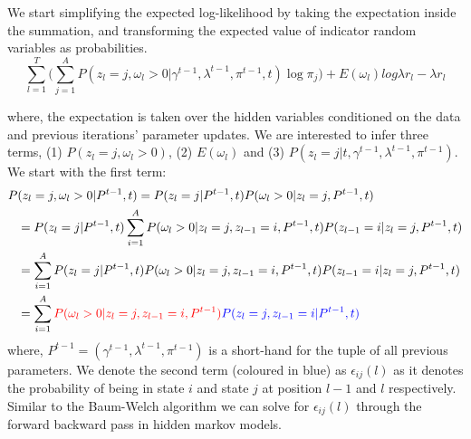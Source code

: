 We start simplifying the expected log-likelihood by taking the expectation inside the summation, and transforming the expected value of indicator random variables as probabilities. 
\begin{equation}
     \sum\limits_{l=1}^{T} \Big( \sum\limits_{j=1}^{A} P(z_l = j, \omega_l > 0 \vert \gamma^{t-1}, \lambda^{t-1}, \pi^{t-1}, t) \log \pi_j \Big) + E(\omega_l) log \lambda r_l - \lambda r_l
\end{equation}

where, the expectation is taken over the hidden variables conditioned on the data and previous iterations' parameter updates. We are interested to infer three terms, (1) $P(z_l = j, \omega_l > 0)$, (2) $E(\omega_l)$ and (3) $P(z_l = j | t, \gamma^{t-1}, \lambda^{t-1}, \pi^{t-1})$. We start with the first term:
\begin{align}
    P&(z_l = j, \omega_l > 0 \vert P^{t-1}, t) = P(z_l = j \vert P^{t-1}, t) P(\omega_l > 0 \vert z_l = j, P^{t-1}, t) \nonumber \\
    &= P(z_l = j \vert P^{t-1}, t) \sum\limits_{i=1}^{A} P(\omega_l > 0 \vert z_l = j, z_{l-1} = i, P^{t-1}, t) P(z_{l-1} = i \vert z_l = j, P^{t-1}, t) \nonumber \\
    &= \sum\limits_{i=1}^{A} P(z_l = j \vert P^{t-1}, t) P(\omega_l > 0 \vert z_l = j, z_{l-1} = i, P^{t-1}, t) P(z_{l-1} = i \vert z_l = j, P^{t-1}, t) \nonumber \\
    &= \sum\limits_{i=1}^{A} \color{red}{P(\omega_l > 0 \vert z_l = j, z_{l-1} = i, P^{t-1})} \color{blue}{P(z_l = j, z_{l-1} = i \vert P^{t-1}, t)}
\label{eq:hmm_estep}
\end{align}
where, $P^{t-1} = (\gamma^{t-1}, \lambda^{t-1}, \pi^{t-1})$ is a short-hand for the tuple of all previous parameters. We denote the second term (coloured in blue) as $\epsilon_{ij}(l)$ as it denotes the probability of being in state $i$ and state $j$ at position $l-1$ and $l$ respectively. Similar to the Baum-Welch algorithm we can solve for $\epsilon_{ij}(l)$ through the forward backward pass in hidden markov models. 


